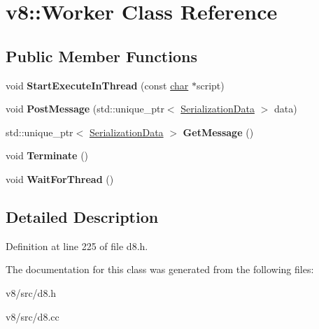 \hypertarget{classv8_1_1Worker}{}\section{v8\+:\+:Worker Class Reference}
\label{classv8_1_1Worker}
\subsection*{Public Member Functions}
\begin{DoxyCompactItemize}
\item 
\mbox{\label{classv8_1_1Worker_a148fd74ff315fb120e2bff451141a6b7}} 
void {\bfseries Start\+Execute\+In\+Thread} (const \mbox{\hyperlink{classchar}{char}} $\ast$script)
\item 
\mbox{\label{classv8_1_1Worker_a7ac418941c1380bebe89708a76477468}} 
void {\bfseries Post\+Message} (std\+::unique\+\_\+ptr$<$ \mbox{\hyperlink{classv8_1_1SerializationData}{Serialization\+Data}} $>$ data)
\item 
\mbox{\label{classv8_1_1Worker_a59c0b25dbe9034d6c28c4fe0e65db118}} 
std\+::unique\+\_\+ptr$<$ \mbox{\hyperlink{classv8_1_1SerializationData}{Serialization\+Data}} $>$ {\bfseries Get\+Message} ()
\item 
\mbox{\label{classv8_1_1Worker_a9252812cf431f134826c80898de978e6}} 
void {\bfseries Terminate} ()
\item 
\mbox{\label{classv8_1_1Worker_a858ecfde01402d3337943224e6ac2a20}} 
void {\bfseries Wait\+For\+Thread} ()
\end{DoxyCompactItemize}


\subsection{Detailed Description}


Definition at line 225 of file d8.\+h.



The documentation for this class was generated from the following files\+:\begin{DoxyCompactItemize}
\item 
v8/src/d8.\+h\item 
v8/src/d8.\+cc\end{DoxyCompactItemize}
